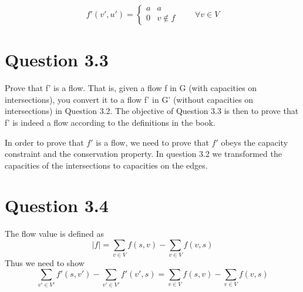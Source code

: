 \documentclass[10pt]{article}
\begin{document}
\begin{equation} 
f'(v',u') = 
\left\{
\begin{array}{rl} 
  a & a \\
  0 & v \notin  f 
\end{array} 
\right. \qquad \forall v \in V
\end{equation} 

\section*{Question 3.3} %
\label{sec:question_3_3}
Prove that f' is a flow. That is, given a flow f in G (with capacities on intersections), you convert it to a flow f' in G' (without capacities on intersections) in Question 3.2. The objective of Question 3.3 is then to prove that f' is indeed a flow according to the definitions in the book.

In order to prove that $f'$ is a flow, we need to prove that $f'$ obeys the capacity constraint and the conservation property. In question 3.2 we transformed the capacities of the intersections to capacities on the edges. 


\section*{Question 3.4} %
\label{sec:question_3_4}
The flow value is defined as
\begin{equation}
 |f| = \sum_{v \in V} f(s,v) - \sum_{v \in V} f(v,s)
\end{equation}
Thus we need to show
\begin{equation}
  \sum_{v' \in V'} f'(s,v') - \sum_{v' \in V'} f'(v',s) =   \sum_{v \in V} f(s,v) - \sum_{v \in V} f(v,s)
\end{equation}

% 



\appendix
\end{document}
